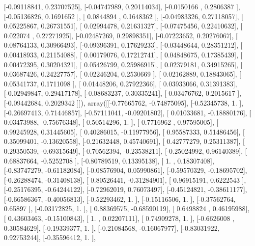 \documentclass{article}
\begin{document}
       [-0.09118841,  0.23707525],
       [-0.04747989,  0.20114034],
       [-0.0150166 ,  0.2806387 ],
       [-0.05136826,  0.1691652 ],
       [ 0.0844894 ,  0.1648362 ],
       [-0.04983326,  0.27118057],
       [ 0.05225867,  0.26731551],
       [ 0.02994478,  0.21631327],
       [-0.07475456,  0.22410632],
       [ 0.022074  ,  0.27271925],
       [-0.02487269,  0.29898351],
       [-0.07223652,  0.20276067],
       [ 0.08764133,  0.30966493],
       [-0.09396391,  0.17629233],
       [-0.03448644,  0.28351212],
       [ 0.00418933,  0.21154088],
       [ 0.00179076,  0.17212741],
       [ 0.04848675,  0.17385439],
       [ 0.00472395,  0.30204321],
       [ 0.05426799,  0.25986915],
       [ 0.02379181,  0.34915265],
       [ 0.03687426,  0.24227757],
       [ 0.02246204,  0.2530669 ],
       [ 0.02162889,  0.18843065],
       [ 0.05341737,  0.1711098 ],
       [ 0.01448206,  0.27922366],
       [ 0.03933066,  0.31391383],
       [-0.02949847,  0.29417178],
       [-0.08683237,  0.30335241],
       [ 0.03476762,  0.2015617 ],
       [-0.09442684,  0.2029342 ]]), array([[-0.77665762, -0.74875095],
       [-0.52345738,  1.        ],
       [-0.26697413,  0.71446857],
       [-0.57111041, -0.09201802],
       [ 0.01033681, -0.18880176],
       [ 0.03473988, -0.75676348],
       [-0.50514296,  1.        ],
       [-0.7716962 ,  0.97595005],
       [ 0.99245928,  0.31445605],
       [ 0.40286015, -0.11977956],
       [ 0.95587333,  0.51486456],
       [ 0.35099401, -0.13620558],
       [-0.21632448,  0.45740691],
       [ 0.42777279,  0.25311387],
       [ 0.29350539, -0.69315649],
       [-0.70562394, -0.23538211],
       [-0.25024992,  0.96140389],
       [ 0.68837664, -0.5252708 ],
       [-0.80789519,  0.13395138],
       [ 1.        ,  0.18307408],
       [-0.83747279, -0.61182084],
       [-0.08576904,  0.05990861],
       [-0.59570329, -0.18695702],
       [-0.26288474, -0.31408138],
       [ 0.80526441, -0.31284901],
       [ 0.96915191,  0.6222543 ],
       [-0.25176395, -0.64244122],
       [-0.72962019,  0.76073497],
       [-0.45124821, -0.38611177],
       [-0.66586367, -0.40056813],
       [-0.52293462,  1.        ],
       [-0.15116506,  1.        ],
       [-0.37562764,  0.65897   ],
       [-0.03172825,  1.        ],
       [ 0.88369575, -0.68590119],
       [ 0.6498824 ,  0.46195988],
       [ 0.43603463, -0.15100843],
       [ 1.        ,  0.02207111],
       [ 0.74909278,  1.        ],
       [-0.6626008 ,  0.30584629],
       [-0.19339377,  1.        ],
       [-0.21084568, -0.16067977],
       [-0.83031922,  0.92753244],
       [-0.35596412,  1.        ],
\end{document}
